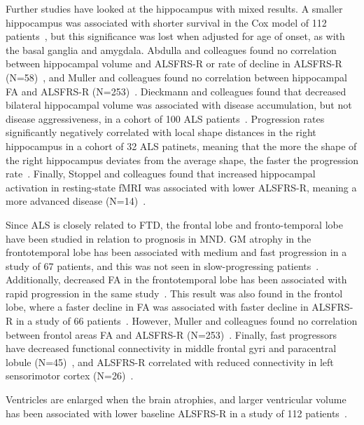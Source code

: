 Further studies have looked at the hippocampus with mixed results.
A smaller hippocampus was associated with shorter survival in the Cox model of 112 patients~\cite{westenengSubcorticalStructuresAmyotrophic2015}, but this significance was lost when adjusted for age of onset, as with the basal ganglia and amygdala.
Abdulla and colleagues found no correlation between hippocampal volume and ALSFRS-R or rate of decline in ALSFRS-R (N=58)~\cite{abdullaHippocampalDegenerationPatients2014}, and Muller and colleagues found no correlation between hippocampal FA and ALSFRS-R (N=253)~\cite{mullerLargescaleMulticentreCerebral2016}.
Dieckmann and colleagues found that decreased bilateral hippocampal volume was associated with disease accumulation, but not disease aggressiveness, in a cohort of 100 ALS patients~\cite{dieckmannCorticalSubcorticalGrey2022}.
Progression rates significantly negatively correlated with local shape distances in the right hippocampus in a cohort of 32 ALS patinets, meaning that the more the shape of the right hippocampus deviates from the average shape, the faster the progression rate~\cite{taeShapeAnalysisSubcortical2020}.
Finally, Stoppel and colleagues found that increased hippocampal activation in resting-state fMRI was associated with lower ALSFRS-R, meaning a more advanced disease (N=14)~\cite{stoppelStructuralFunctionalHallmarks2014}.

Since ALS is closely related to FTD, the frontal lobe and fronto-temporal lobe have been studied in relation to prognosis in MND.
GM atrophy in the frontotemporal lobe has been associated with medium and fast progression in a study of 67 patients, and this was not seen in slow-progressing patients~\cite{sendaStructuralMRICorrelates2017}.
Additionally, decreased FA in the frontotemporal lobe has been associated with rapid progression in the same study~\cite{sendaStructuralMRICorrelates2017}.
This result was also found in the frontol lobe, where a faster decline in FA was associated with faster decline in ALSFRS-R in a study of 66 patients~\cite{kalraProspectiveHarmonizedMulticenter2020}.
However, Muller and colleagues found no correlation between frontol areas FA and ALSFRS-R (N=253)~\cite{mullerLargescaleMulticentreCerebral2016}.
Finally, fast progressors have decreased functional connectivity in middle frontal gyri and paracentral lobule (N=45)~\cite{trojsiRestingStateFunctional2021}, and ALSFRS-R correlated with reduced connectivity in left sensorimotor cortex (N=26)~\cite{agostaSensorimotorFunctionalConnectivity2011}.

Ventricles are enlarged when the brain atrophies, and larger ventricular volume has been associated with lower baseline ALSFRS-R in a study of 112 patients~\cite{westenengSubcorticalStructuresAmyotrophic2015}.

